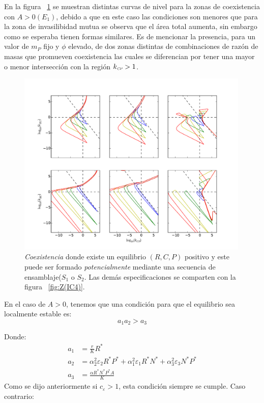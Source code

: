 En la figura  ~\ref{fig:PSCoexistence} se muestran distintas curvas de nivel para la zonas de coexistencia con $A > 0(E_1)$, debido a que en este caso las condiciones son menores que para la zona de invasilibidad mutua se observa que el \'area total aumenta, sin embargo como se esperaba tienen formas similares. Es de mencionar la presencia, para un valor de $m_P$ fijo y $\phi$ elevado, de dos zonas distintas de combinaciones de raz\'on de masas que promueven coexistencia las cuales se diferencian por tener una mayor o menor intersecci\'on con la regi\'on $k_{\textit{\tiny CP}} > 1$. \\

\begin{figure}
  \centering
  \includegraphics[width = 0.99\textwidth]{./Plots/CoexistenceAcGrGr.pdf}
  \caption[Env $Coexistencia$]{\emph{Coexistencia} donde existe un equilibrio $(R,C,P)$ positivo y este puede ser formado \emph{potencialmente} mediante una secuencia de ensamblaje($S_1$ o $S_2$. Las dem\'as especificaciones se comparten con la figura ~\ref{fig:Z(IC4)}.}
  \label{fig:PSCoexistence}
\end{figure}

En el caso de $ A > 0 $, tenemos que una condici\'on para que el equilibrio sea localmente estable es:
\begin{equation}
  a_1 a_2 > a_3
\end{equation}

Donde:
\begin{equation}
  \begin{aligned}
    a_1 &= \frac{r}{K}R^* \\
    a_2 &= \alpha_2^2 \varepsilon_2 R^* P^*  + \alpha_1^2 \varepsilon_1 R^* N^*  + \alpha_3^2 \varepsilon_3 N^* P^*\\
    a_3 &= \frac{\alpha R^* N^* P^* A}{K} 
  \end{aligned}
\end{equation}
Como se dijo anteriormente si $c_\varepsilon > 1$, esta condici\'on siempre se cumple. Caso contrario:

